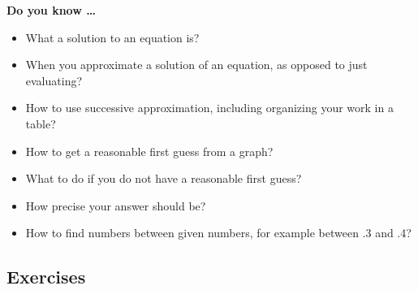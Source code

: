 
 

\noindent \textbf{Do you know \ldots}

\begin{itemize} 
\item What a solution to an equation is? 
\item When you approximate a solution of an equation, as opposed to just evaluating? 
\item How to use successive approximation, including organizing your work in a table? 
\item How to get a reasonable first guess from a graph? 
\item What to do if you do not have a reasonable first guess? 
\item How precise your answer should be? 
\item How to find numbers between given numbers, for example between .3 and .4? 
  
\end{itemize}

\subsection*{Exercises}

